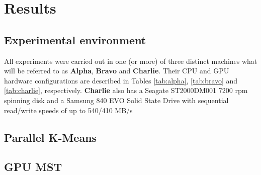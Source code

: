 \chapter{Results}
\label{chapter:results}

%
%

\section{Experimental environment}
\label{sec:system configs}

All experiments were carried out in one (or more) of three distinct machines what will be referred to as \textbf{Alpha}, \textbf{Bravo} and \textbf{Charlie}.
Their CPU and GPU hardware configurations are described in Tables \ref{tab:alpha}, \ref{tab:bravo} and \ref{tab:charlie}, respectively.
\textbf{Charlie} also has a Seagate ST2000DM001 7200 rpm spinning disk and a Samsung 840 EVO Solid State Drive with sequential read/write speeds of up to 540/410 MB/s







%
%

\section{Parallel K-Means}
\label{sec:parallel kmeans}

%
%

\section{GPU MST}
\label{sec:gpu mst}

